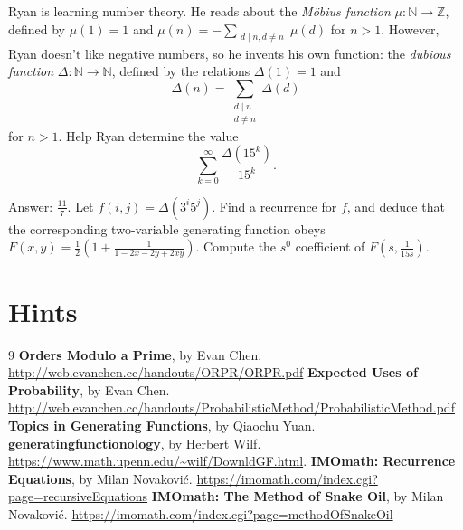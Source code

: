 \documentclass[11pt]{scrartcl}
\begin{document}
\begin{problem}
  Ryan is learning number theory.
  He reads about the \emph{M\"obius function} $\mu : \mathbb N \to \mathbb Z$,
  defined by $\mu(1)=1$ and
  $\mu(n) = -\sum_{\substack{d\mid n, d \neq n}} \mu(d)$
  for $n>1$.
  However, Ryan doesn't like negative numbers, so he invents his own function:
  the \emph{dubious function} $\Delta : \mathbb N \to \mathbb N$,
  defined by the relations $\Delta(1)=1$ and
  \[ \Delta(n) = \sum_{\substack{d\mid n \\ d \neq n}} \Delta(d) \]
  for $n > 1$. Help Ryan determine the value
  \[ \sum_{k=0}^{\infty} \frac{\Delta(15^k)}{15^k}.  \]
  \begin{hint}
    Answer: $\frac{11}{7}$.
    Let $f(i,j) = \Delta(3^i5^j)$.
    Find a recurrence for $f$, and deduce that the
    corresponding two-variable generating function obeys
    $F(x,y)=\frac{1}{2}\left(1+\frac{1}{1-2x-2y+2xy}\right)$.
    Compute the $s^0$ coefficient of $F(s, \frac{1}{15s})$.
  \end{hint}
\end{problem}

\section{Hints}
\makehints

\begin{thebibliography}{9}
   \textbf{Orders Modulo a Prime}, by Evan Chen.
    \url{http://web.evanchen.cc/handouts/ORPR/ORPR.pdf}
   \textbf{Expected Uses of Probability}, by Evan Chen.
    \url{http://web.evanchen.cc/handouts/ProbabilisticMethod/ProbabilisticMethod.pdf}
   \textbf{Topics in Generating Functions}, by Qiaochu Yuan.
   \textbf{generatingfunctionology}, by Herbert Wilf.
    \url{https://www.math.upenn.edu/~wilf/DownldGF.html}.
   \textbf{IMOmath: Recurrence Equations}, by Milan Novakovi\'c.
    \url{https://imomath.com/index.cgi?page=recursiveEquations}
   \textbf{IMOmath: The Method of Snake Oil}, by Milan Novakovi\'c.
    \url{https://imomath.com/index.cgi?page=methodOfSnakeOil}
\end{thebibliography}
\end{document}
